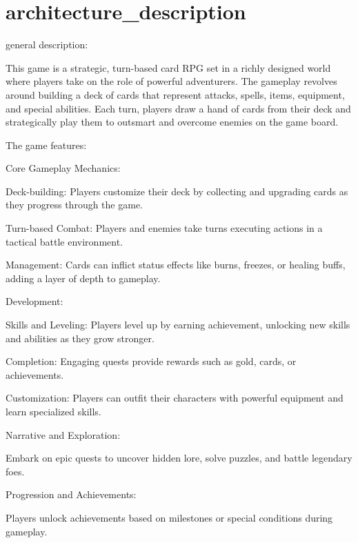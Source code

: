\chapter{architecture\+\_\+description}
\hypertarget{md_docs_2architecture_2architecture__description}{}\label{md_docs_2architecture_2architecture__description}
general description\+:

This game is a strategic, turn-\/based card RPG set in a richly designed world where players take on the role of powerful adventurers. The gameplay revolves around building a deck of cards that represent attacks, spells, items, equipment, and special abilities. Each turn, players draw a hand of cards from their deck and strategically play them to outsmart and overcome enemies on the game board.

The game features\+:
\begin{DoxyEnumerate}
\item Core Gameplay Mechanics\+:
\begin{DoxyItemize}
\item Deck-\/building\+: Players customize their deck by collecting and upgrading cards as they progress through the game.
\item Turn-\/based Combat\+: Players and enemies take turns executing actions in a tactical battle environment.
\item {} Management\+: Cards can inflict status effects like burns, freezes, or healing buffs, adding a layer of depth to gameplay.
\end{DoxyItemize}
\item {} Development\+:
\begin{DoxyItemize}
\item Skills and Leveling\+: Players level up by earning achievement, unlocking new skills and abilities as they grow stronger.
\item {} Completion\+: Engaging quests provide rewards such as gold, cards, or achievements.
\item Customization\+: Players can outfit their characters with powerful equipment and learn specialized skills.
\end{DoxyItemize}
\item Narrative and Exploration\+:
\begin{DoxyItemize}
\item Embark on epic quests to uncover hidden lore, solve puzzles, and battle legendary foes.
\end{DoxyItemize}
\item Progression and Achievements\+:
\begin{DoxyItemize}
\item Players unlock achievements based on milestones or special conditions during gameplay.
\end{DoxyItemize}
\end{DoxyEnumerate}


